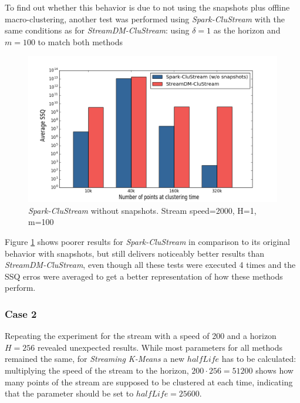 \documentclass{llncs}
\begin{document}
To find out whether this behavior is due to not using the snapshots plus offline macro-clustering, another test was performed using \textit{Spark-CluStream} with the same conditions as for \textit{StreamDM-CluStream}: using $\delta = 1$ as the horizon and $m=100$ to match both methods

\begin{figure}[h]
 \centering
 \includegraphics[scale=0.4]{./styles/comparisonNoSnaps.png}
 \caption{\textit{Spark-CluStream} without snapshots. Stream speed=2000, H=1, m=100}
 \label{fig:comparisonNoSnaps}
\end{figure}

Figure \ref{fig:comparisonNoSnaps} shows poorer results for \textit{Spark-CluStream} in comparison to its original behavior with snapshots, but still delivers noticeably better results than \textit{StreamDM-CluStream}, even though all these tests were executed 4 times and the SSQ erros were averaged to get a better representation of how these methods perform.

\subsubsection{Case 2}

Repeating the experiment for the stream with a speed of 200 and a horizon $H=256$ revealed unexpected results. While most parameters for all methods remained the same, for \textit{Streaming K-Means} a new $halfLife$ has to be calculated: multiplying the speed of the stream to the horizon, $200\cdot 256=51200$ shows how many points of the stream are supposed to be clustered at each time, indicating that the parameter should be set to $halfLife=25600$. 
\end{document}
